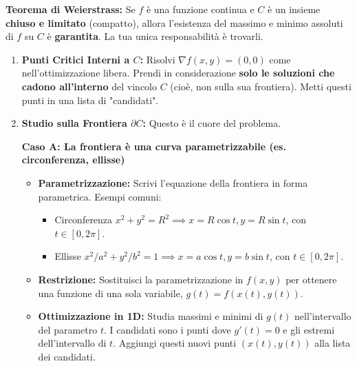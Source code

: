 \documentclass[a4paper, 12pt]{article}
\begin{document}
\begin{info}
\textbf{Teorema di Weierstrass:} Se $f$ è una funzione continua e $C$ è un insieme \textbf{chiuso e limitato} (compatto), allora l'esistenza del massimo e minimo assoluti di $f$ su $C$ è \textbf{garantita}.  La tua unica responsabilità è trovarli.
\end{info}


\begin{enumerate}
    \item \textbf{Punti Critici Interni a \texorpdfstring{$C$}{C}:}
    Risolvi $\nabla f(x,y) = (0,0)$ come nell'ottimizzazione libera.  Prendi in considerazione \textbf{solo le soluzioni che cadono all'interno} del vincolo $C$ (cioè, non sulla sua frontiera).  Metti questi punti in una lista di "candidati".

    \item \textbf{Studio sulla Frontiera \texorpdfstring{$\partial C$}{}:} Questo è il cuore del problema. 
    
    \textbf{Caso A: La frontiera è una curva parametrizzabile (es. circonferenza, ellisse)}
    \begin{itemize}
        \item \textbf{Parametrizzazione:} Scrivi l'equazione della frontiera in forma parametrica. Esempi comuni: 
        \begin{itemize}
            \item Circonferenza $x^2+y^2=R^2 \implies x=R\cos t, y=R\sin t$, con $t \in [0, 2\pi]$.
            \item Ellisse $x^2/a^2+y^2/b^2=1 \implies x=a\cos t, y=b\sin t$, con $t \in [0, 2\pi]$.
        \end{itemize}
        \item \textbf{Restrizione:} Sostituisci la parametrizzazione in $f(x,y)$ per ottenere una funzione di una sola variabile, $g(t) = f(x(t), y(t))$. 
        \item \textbf{Ottimizzazione in 1D:} Studia massimi e minimi di $g(t)$ nell'intervallo del parametro $t$. I candidati sono i punti dove $g'(t)=0$ e gli estremi dell'intervallo di $t$.  Aggiungi questi nuovi punti $(x(t), y(t))$ alla lista dei candidati.
    \end{itemize}


\end{enumerate}
\end{document}
